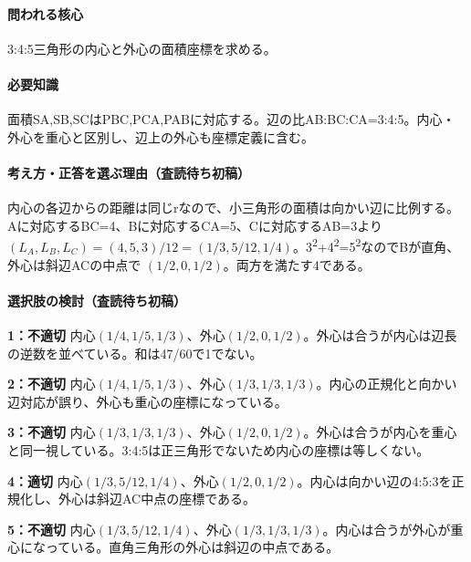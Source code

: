 \paragraph{問われる核心} 3:4:5三角形の内心と外心の面積座標を求める。

\paragraph{必要知識} 面積SA,SB,SCはPBC,PCA,PABに対応する。辺の比AB:BC:CA=\allowbreak{}3:4:5。内心・外心を重心と区別し、辺上の外心も座標定義に含む。

\paragraph{考え方・正答を選ぶ理由（査読待ち初稿）} 内心の各辺からの距離は同じrなので、小三角形の面積は向かい辺に比例する。Aに対応するBC=\allowbreak{}4、Bに対応するCA=\allowbreak{}5、Cに対応するAB=\allowbreak{}3より \((L_A,L_B,L_C)=(4,5,3)/12=(1/3,5/12,1/4)\)。3\textsuperscript{2}+4\textsuperscript{2}=5\textsuperscript{2}なのでBが直角、外心は斜辺ACの中点で \((1/2,0,1/2)\)。両方を満たす4である。

\paragraph{選択肢の検討（査読待ち初稿）}\mbox{}\par

\noindent\textbf{1：不適切} 内心\((1/4,1/5,1/3)\)、外心\((1/2,0,1/2)\)。外心は合うが内心は辺長の逆数を並べている。和は47/60で1でない。\par

\noindent\textbf{2：不適切} 内心\((1/4,1/5,1/3)\)、外心\((1/3,1/3,1/3)\)。内心の正規化と向かい辺対応が誤り、外心も重心の座標になっている。\par

\noindent\textbf{3：不適切} 内心\((1/3,1/3,1/3)\)、外心\((1/2,0,1/2)\)。外心は合うが内心を重心と同一視している。3:4:5は正三角形でないため内心の座標は等しくない。\par

\noindent\textbf{4：適切} 内心\((1/3,5/12,1/4)\)、外心\((1/2,0,1/2)\)。内心は向かい辺の4:5:3を正規化し、外心は斜辺AC中点の座標である。\par

\noindent\textbf{5：不適切} 内心\((1/3,5/12,1/4)\)、外心\((1/3,1/3,1/3)\)。内心は合うが外心が重心になっている。直角三角形の外心は斜辺の中点である。\par

